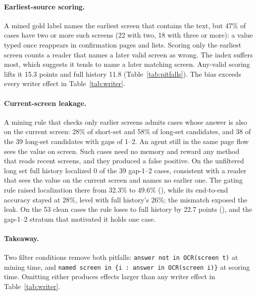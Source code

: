 \paragraph{Earliest-source scoring.} A mined gold label names the earliest screen that contains the text, but 47\% of cases have two or more such screens (22 with two, 18 with three or more): a value typed once reappears in confirmation pages and lists. Scoring only the earliest screen counts a reader that names a later valid screen as wrong. The index suffers most, which suggests it tends to name a later matching screen. Any-valid scoring lifts it 15.3 points and full history 11.8 (Table~\ref{tab:pitfalls}). The bias exceeds every writer effect in Table~\ref{tab:writer}.

\paragraph{Current-screen leakage.} A mining rule that checks only earlier screens admits cases whose answer is also on the current screen: 28\% of short-set and 58\% of long-set candidates, and 38 of the 39 long-set candidates with gaps of 1--2. An agent still in the same page flow sees the value on screen. Such cases need no memory and reward any method that reads recent screens, and they produced a false positive. On the unfiltered long set full history localized 0 of the 39 gap-1--2 cases, consistent with a reader that sees the value on the current screen and names no earlier one. The gating rule raised localization there from 32.3\% to 49.6\% (), while its end-to-end accuracy stayed at 28\%, level with full history's 26\%; the mismatch exposed the leak. On the 53 clean cases the rule loses to full history by 22.7 points (), and the gap-1--2 stratum that motivated it holds one case.

\paragraph{Takeaway.} Two filter conditions remove both pitfalls: \texttt{answer not in OCR(screen t)} at mining time, and \texttt{named screen in \{i : answer in OCR(screen i)\}} at scoring time. Omitting either produces effects larger than any writer effect in Table~\ref{tab:writer}.
